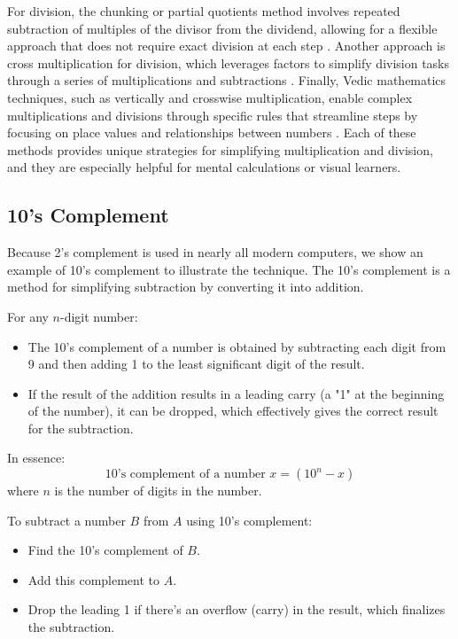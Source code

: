 For division, the chunking or partial quotients method involves repeated subtraction of multiples of the divisor from the dividend, allowing for a flexible approach that does not require exact division at each step \cite{reys1995}. Another approach is cross multiplication for division, which leverages factors to simplify division tasks through a series of multiplications and subtractions \cite{parker2014}. Finally, Vedic mathematics techniques, such as vertically and crosswise multiplication, enable complex multiplications and divisions through specific rules that streamline steps by focusing on place values and relationships between numbers \cite{tirthaji1992}. Each of these methods provides unique strategies for simplifying multiplication and division, and they are especially helpful for mental calculations or visual learners.

\subsection{10's Complement} \label{sub:10s_complement}
Because 2's complement is used in nearly all modern computers, we show an example of 10's complement to illustrate the technique.
The 10’s complement is a method for simplifying subtraction by converting it into addition. 

\vspace{\baselineskip}\par
For any \( n \)-digit number:
 \begin{itemize}
    \item The 10's complement of a number is obtained by subtracting each digit from 9 and then adding 1 to the least significant digit of the result.
    \item If the result of the addition results in a leading carry (a "1" at the beginning of the number), it can be dropped, which effectively gives the correct result for the subtraction.
  \end{itemize}

\vspace{\baselineskip}\par
In essence:
\[
\text{10's complement of a number } x = (10^n - x)
\]
where \( n \) is the number of digits in the number.

\vspace{\baselineskip}\par
To subtract a number \( B \) from \( A \) using 10’s complement:
 \begin{itemize}
    \item Find the 10’s complement of \( B \).
    \item Add this complement to \( A \).
    \item Drop the leading 1 if there’s an overflow (carry) in the result, which finalizes the subtraction.
    \end{itemize}
  
